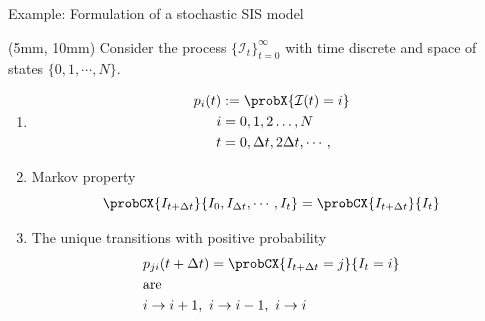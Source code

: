 \begin{frame}{Example: Formulation of a stochastic SIS model}
    \begin{textblock*}{55mm}(5mm, 10mm)
        Consider the process $\{\mathcal{I}_t\}_{t=0} ^ \infty$ with 
        time discrete and space of states $\{0,1,\cdots, N \}$.
        \begin{enumerate}[label=(H-(\arabic*)]
            \item <2->
                \begin{align*}
                    p_i(t) &:= \probX{\mathcal{I}(t) = i}
                    \\
                    i &= 0,1,2\dots, N
                    \\
                    t &= 0, \Delta t, 2 \Delta t, \cdots,
                \end{align*}
            \item <3->
                Markov property
                $$
                    \probCX{I_{t + \Delta t}}{  I_0, I_{\Delta t}, \cdots, I_t}
                    =\probCX{I_{t + \Delta t} }{I_t}
                $$
            \item <4->
                The unique transitions with positive 
                probability
                \begin{align*}
                    & p_{ji}(t + \Delta t)
                    = 
                    \probCX{I_{t + \Delta t} = j}{I_t = i}
                    \\
                    &\text{are}
                    \\
                    & i \to i+1, \ i \to i-1,  \ i \to i
                \end{align*}
        \end{enumerate}
    \end{textblock*}
    \only<5->{
        \begin{textblock*}{50mm}(55mm, 10mm)
            \begin{equation*}
                p_{ji}(\Delta t):=
                    \begin{cases}
                        \frac{\beta i (N - i)}{N} \Delta t, 
                            & j = i + 1
                        \\
                        (b + \gamma) i \Delta t, 
                            & j = i - 1
                        \\
                        1 - 
                        \left[
                            \frac{\beta i (N - i)}{N} +

\end{cases}
\end{equation*}
\end{textblock*}}
\end{frame}
